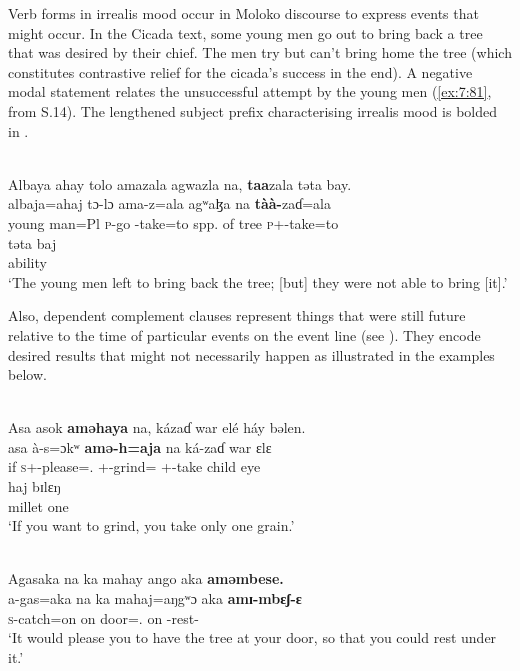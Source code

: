 Verb forms in irrealis mood occur in Moloko discourse to express events that might occur. In the Cicada text, some young men go out to bring back a tree that was desired by their chief. The men try but can’t bring home the tree (which constitutes contrastive relief for the cicada’s success in the end).  A negative modal statement relates the unsuccessful attempt by the young men (\ref{ex:7:81}, from S.14). The lengthened subject prefix characterising irrealis mood is bolded in . 

\ea\label{ex:7:81}\\
Albaya  ahay  tolo  amazala  agwazla  na,  \textbf{taa}zala  təta  bay.\\
\gll  albaja=ahaj  tɔ-lɔ     ama-z=ala   agʷaɮa        na  \textbf{tàà-}zaɗ=ala \\   
      {young man}=Pl       \textsc{p}-go  {\DEP}-take=to  {spp. of tree}  {\PSP}  \textsc{p}+{\HOR}-take=to \\ 
      
      \medskip
\gll təta  baj\\
     ability  {\NEG}\\
\glt  ‘The young men left to bring back the tree; [but] they were not able to bring [it].’\\
\z 

Also, dependent complement clauses represent things that were still future relative to the time of particular events on the event line (see ). They encode desired results that might not necessarily happen as illustrated in the examples below. 

\ea\label{ex:7:82}\\
Asa  asok  \textbf{aməhaya}  na,  kázaɗ  war  elé  háy  bəlen.\\
\gll  asa  à-s=ɔkʷ  \textbf{amə-h}\textbf{=aja} na  ká-zaɗ war ɛlɛ\\ 
      if \textsc{s}+{\PFV}-please={\twoS}.{\IO} {\DEP}+{\PFV}-grind={\PLU} {\PSP} {\twoS}+{\IFV}-take child eye\\ 
      
\medskip
\gll haj bɪlɛŋ\\
     millet  one\\
\glt  ‘If you want to grind, you take only one grain.’\\
\z


\ea\label{ex:7:83}\\
Agasaka  na  ka  mahay  ango  aka  \textbf{aməmbese.}\\
\gll  a-gas=aka      na  ka    mahaj=aŋgʷɔ         aka  \textbf{amɪ-mbɛʃ-ɛ}\\
      \textsc{s}-catch=on             {\PSP}  on    door={\twoS}.{\POSS}  on  {\DEP}-rest{}-{\CL}\\
\glt  ‘It would please you to have the tree at your door, so that you could rest under it.’ \\
\z 
{}

